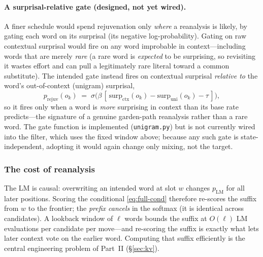 \documentclass[11pt]{article}
\providecommand{\pLM}{p_{\mathrm{LM}}}
\providecommand{\code}[1]{\texttt{#1}}
\begin{document}
\paragraph{A surprisal-relative gate (designed, not yet wired).} A finer schedule would spend rejuvenation only \emph{where} a reanalysis is likely, by gating each word on its surprisal (its negative log-probability). Gating on raw contextual surprisal would fire on any word improbable in context---including words that are merely \emph{rare} (a rare word is \emph{expected} to be surprising, so revisiting it wastes effort and can pull a legitimately rare literal toward a common substitute). The intended gate instead fires on contextual surprisal \emph{relative to} the word's out-of-context (unigram) surprisal,
\begin{equation}\label{eq:gate}
  p_{\mathrm{rejuv}}(o_k) \;=\; \sigma\!\big(\beta\,[\,\mathrm{surp}_{\mathrm{ctx}}(o_k)
                                              - \mathrm{surp}_{\mathrm{uni}}(o_k) - \tau\,]\big),
\end{equation}
so it fires only when a word is \emph{more} surprising in context than its base rate predicts---the signature of a genuine garden-path reanalysis rather than a rare word. The gate function is implemented (\code{unigram.py}) but is not currently wired into the filter, which uses the fixed window above; because any such gate is state-independent, adopting it would again change only mixing, not the target.

\subsubsection{The cost of reanalysis}
The LM is causal: overwriting an intended word at slot $w$ changes $\pLM$ for all later positions. Scoring the conditional \eqref{eq:full-cond} therefore re-scores the suffix from $w$ to the frontier; the \emph{prefix cancels} in the softmax (it is identical across candidates). A lookback window of $\ell$ words bounds the suffix at $O(\ell)$ LM evaluations per candidate per move---and re-scoring the suffix is exactly what lets later context vote on the earlier word. Computing that suffix efficiently is the central engineering problem of Part~II (\S\ref{sec:kv}).
\end{document}
